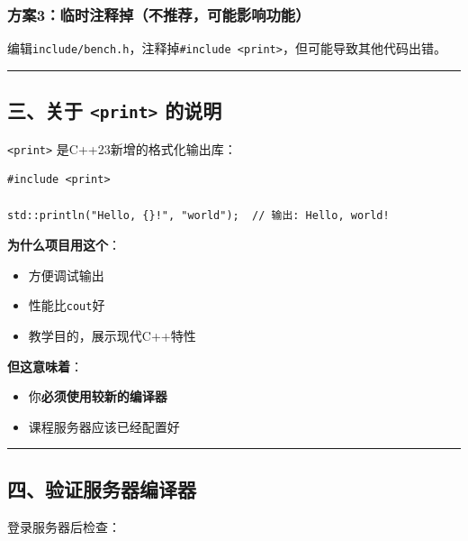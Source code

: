 \documentclass[11pt, a4paper]{article}
\begin{document}
\begin{aibox}
\subsubsection*{方案3：临时注释掉（不推荐，可能影响功能）}

编辑\texttt{include/bench.h}，注释掉\texttt{\#include \textless print\textgreater}，但可能导致其他代码出错。

\begin{center}\rule{\textwidth}{0.4pt}\end{center}

\subsection*{三、关于 \texttt{\textless print\textgreater} 的说明}

\texttt{\textless print\textgreater} 是C++23新增的格式化输出库：

\begin{tcolorbox}[colback=white,colframe=gray!50!white,boxrule=0.5pt,arc=2pt,left=5pt,right=5pt,top=5pt,bottom=5pt]
\begin{verbatim}
#include <print>

std::println("Hello, {}!", "world");  // 输出: Hello, world!
\end{verbatim}
\end{tcolorbox}

\textbf{为什么项目用这个}：
\begin{itemize}
    \item 方便调试输出
    \item 性能比\texttt{cout}好
    \item 教学目的，展示现代C++特性
\end{itemize}

\textbf{但这意味着}：
\begin{itemize}
    \item 你\textbf{必须使用较新的编译器}
    \item 课程服务器应该已经配置好
\end{itemize}

\begin{center}\rule{\textwidth}{0.4pt}\end{center}

\subsection*{四、验证服务器编译器}

登录服务器后检查：


\end{aibox}
\end{document}
